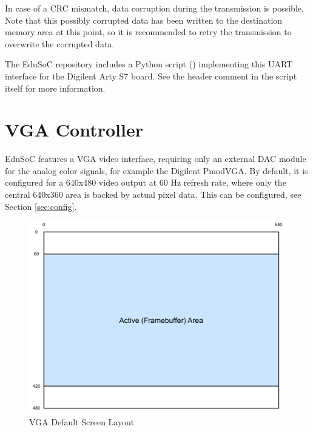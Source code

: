In case of a CRC mismatch, data corruption during the transmission is possible. Note that this possibly corrupted data has been written to the destination memory area at this point, so it is recommended to retry the transmission to overwrite the corrupted data.

The EduSoC repository includes a Python script () implementing this UART interface for the Digilent Arty S7 board. See the header comment in the script itself for more information.

\newpage
\section{VGA Controller}\label{sec:vga}
EduSoC features a VGA video interface, requiring only an external DAC module for the analog color signals, for example the Digilent PmodVGA.
By default, it is configured for a 640x480 video output at 60 Hz refresh rate, where only the central 640x360 area is backed by actual pixel data. This can be configured, see Section \ref{sec:config}.\\
\begin{figure}[H]
    \centering
    \includegraphics[width=.9\textwidth]{graphics/EduSoC VGA Layout.pdf}
    \vspace{-1em}
    \caption{VGA Default Screen Layout}
    \label{fig:vga_layout}
\end{figure}


